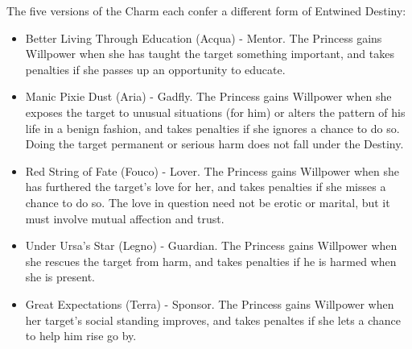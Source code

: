 \noindent The five versions of the Charm each confer a different form of Entwined Destiny:
\begin{itemize}
\item    Better Living Through Education (Acqua) - Mentor. The Princess gains Willpower when she has taught the target something important, and takes penalties if she passes up an opportunity to educate.

\item    Manic Pixie Dust (Aria) - Gadfly. The Princess gains Willpower when she exposes the target to unusual situations (for him) or alters the pattern of his life in a benign fashion, and takes penalties if she ignores a chance to do so. Doing the target permanent or serious harm does not fall under the Destiny.

\item    Red String of Fate (Fouco) - Lover. The Princess gains Willpower when she has furthered the target's love for her, and takes penalties if she misses a chance to do so. The love in question need not be erotic or marital, but it must involve mutual affection and trust.

\item    Under Ursa's Star (Legno) - Guardian. The Princess gains Willpower when she rescues the target from harm, and takes penalties if he is harmed when she is present.

\item    Great Expectations (Terra) - Sponsor. The Princess gains Willpower when her target's social standing improves, and takes penaltes if she lets a chance to help him rise go by. 
 \end{itemize}

